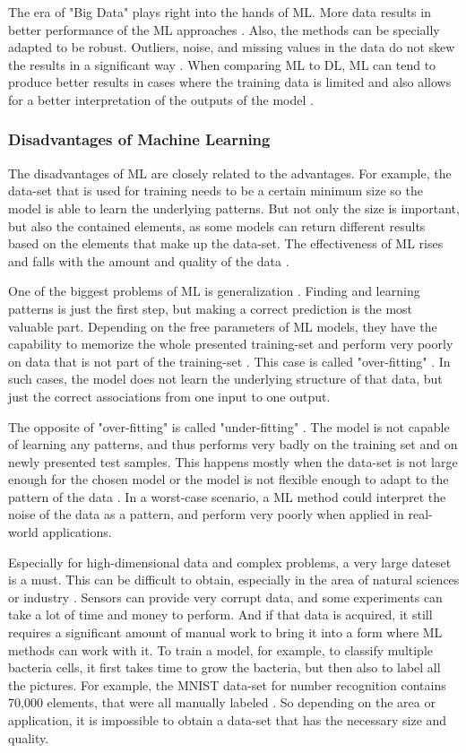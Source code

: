 The era of "Big Data" plays right into the hands of ML. More data results in better performance of the ML approaches \cite{Wuest}. Also, the methods can be specially adapted to be robust. Outliers, noise, and missing values in the data do not skew the results in a significant way \cite{Theodoridis}. When comparing ML to DL, ML can tend to produce better results in cases where the training data is limited and also allows for a better interpretation of the outputs of the model \cite{Janiesch}.

\subsubsection*{Disadvantages of Machine Learning}
The disadvantages of ML are closely related to the advantages. For example, the data-set that is used for training needs to be a certain minimum size so the model is able to learn the underlying patterns. But not only the size is important, but also the contained elements, as some models can return different results based on the elements that make up the data-set. The effectiveness of ML rises and falls with the amount and quality of the data \cite{Janiesch, Bishop}.

One of the biggest problems of ML is generalization \cite{Bishop}. Finding and learning patterns is just the first step, but making a correct prediction is the most valuable part. Depending on the free parameters of ML models, they have the capability to memorize the whole presented training-set and perform very poorly on data that is not part of the training-set \cite{Zhangpiml}. This case is called "over-fitting" \cite{Jabbar}. In such cases, the model does not learn the underlying structure of that data, but just the correct associations from one input to one output. 

The opposite of "over-fitting" is called "under-fitting" \cite{Jabbar}. The model is not capable of learning any patterns, and thus performs very badly on the training set and on newly presented test samples. This happens mostly when the data-set is not large enough for the chosen model or the model is not flexible enough to adapt to the pattern of the data \cite{Will}. In a worst-case scenario, a ML method could interpret the noise of the data as a pattern, and perform very poorly when applied in real-world applications.

Especially for high-dimensional data and complex problems, a very large dateset is a must. This can be difficult to obtain, especially in the area of natural sciences or industry \cite{Wuest}. Sensors can provide very corrupt data, and some experiments can take a lot of time and money to perform. And if that data is acquired, it still requires a significant amount of manual work to bring it into a form where ML methods can work with it. To train a model, for example, to classify multiple bacteria cells, it first takes time to grow the bacteria, but then also to label all the pictures. For example, the MNIST data-set for number recognition contains 70,000 elements, that were all manually labeled \cite{Pavlo}. So depending on the area or application, it is impossible to obtain a data-set that has the necessary size and quality. 

